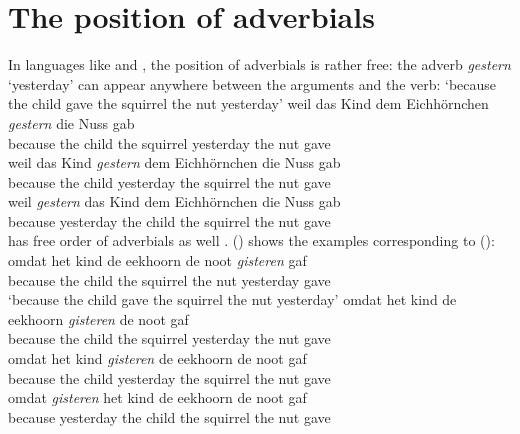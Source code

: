 \section{The position of adverbials}
\label{sec-phenomena-position-of-adverbials}

In languages like  and , the position of adverbials is rather free: the adverb \emph{gestern}
`yesterday' can appear anywhere between the arguments and the verb:
\eal
\ex
{}
\glt `because the child gave the squirrel the nut yesterday'
\ex 
\gll weil das Kind dem Eichhörnchen \emph{gestern} die Nuss gab\\
     because the child the squirrel yesterday the nut gave\\
\ex 
\gll weil das Kind \emph{gestern} dem Eichhörnchen die Nuss gab\\
     because the child yesterday the squirrel the nut gave\\
\ex 
\gll weil \emph{gestern} das Kind dem Eichhörnchen die Nuss gab\\
     because yesterday the child the squirrel the nut gave\\
\zl
{} has free order of adverbials as well \parencites[]{Neeleman94b-u}[]{Koster99a-u}[Section~6]{Bouma2003a-u}. () shows the  examples corresponding to
():
\eal
\ex
\gll omdat het kind de eekhoorn de noot \emph{gisteren} gaf\\ 
     because the child the squirrel the nut yesterday gave\\\dutch
\glt `because the child gave the squirrel the nut yesterday'
\ex 
\gll omdat het kind de eekhoorn \emph{gisteren} de noot gaf\\
     because the child the squirrel yesterday the nut gave\\
\ex 
\gll omdat het kind \emph{gisteren} de eekhoorn de noot gaf\\
     because the child yesterday the squirrel the nut gave\\
\ex 
\gll omdat \emph{gisteren} het kind de eekhoorn de noot gaf\\
     because yesterday the child the squirrel the nut gave\\
\zl


